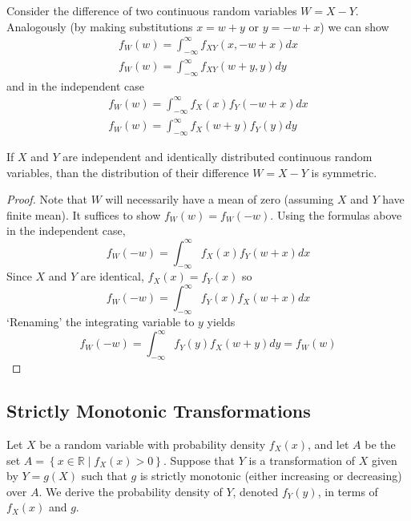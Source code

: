 \documentclass[11pt]{report} %
\begin{document}
Consider the difference of two continuous random variables $W = X - Y$. Analogously (by making substitutions $x = w + y$ or $y = -w + x$) we can show
\begin{gather}
f_{W}\left(w\right) = \int_{-\infty}^{\infty}f_{XY}\left(x, -w + x\right)dx \\
f_{W}\left(w\right) = \int_{-\infty}^{\infty}f_{XY}\left(w + y, y\right)dy
\end{gather}
and in the independent case
\begin{gather}
f_{W}\left(w\right) = \int_{-\infty}^{\infty}f_{X}\left(x\right)f_{Y}\left(-w + x\right)dx \\
f_{W}\left(w\right) = \int_{-\infty}^{\infty}f_{X}\left(w + y\right)f_{Y}\left(y\right)dy
\end{gather}
\begin{theorem}
If $X$ and $Y$ are independent and identically distributed continuous random variables, than the distribution of their difference $W = X - Y$ is symmetric.
\end{theorem}
\begin{proof}
Note that $W$ will necessarily have a mean of zero (assuming $X$ and $Y$ have finite mean). It suffices to show $f_{W}\left(w\right) = f_{W}\left(-w\right)$. Using the formulas above in the independent case,
\begin{equation}
f_{W}\left(-w\right) = \int_{-\infty}^{\infty}f_{X}\left(x\right)f_{Y}\left(w + x\right)dx
\end{equation}
Since $X$ and $Y$ are identical, $f_{X}\left(x\right) = f_{Y}\left(x\right)$ so
\begin{equation}
f_{W}\left(-w\right) = \int_{-\infty}^{\infty}f_{Y}\left(x\right)f_{X}\left(w + x\right)dx
\end{equation}
`Renaming' the integrating variable to $y$ yields
\begin{equation}
f_{W}\left(-w\right) = \int_{-\infty}^{\infty}f_{Y}\left(y\right)f_{X}\left(w + y\right)dy = f_{W}\left(w\right)
\end{equation}
\end{proof}

\subsection{Strictly Monotonic Transformations}

Let $X$ be a random variable with probability density $f_{X}\left(x\right)$, and let $A$ be the set $A = \left\{x \in\mathbb{R}\middle| f_{X}\left(x\right) > 0\right\}$. Suppose that $Y$ is a transformation of $X$ given by $Y = g\left(X\right)$ such that $g$ is strictly monotonic (either increasing or decreasing) over $A$. We derive the probability density of $Y$, denoted $f_{Y}\left(y\right)$, in terms of $f_{X}\left(x\right)$ and $g$. \\
\end{document}
